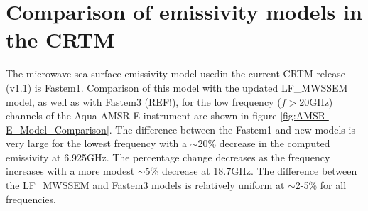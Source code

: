 \section{Comparison of emissivity models in the CRTM}

The microwave sea surface emissivity model usedin the current CRTM release (v1.1) is Fastem1\cite{Fastem1}. Comparison of this model with the updated LF\_MWSSEM model, as well as with Fastem3 (REF!), for the low frequency ($f\!>$20GHz) channels of the Aqua AMSR-E instrument are shown in figure \ref{fig:AMSR-E_Model_Comparison}. The difference between the Fastem1 and new models is very large for the lowest frequency with a $\sim$20\% decrease in the computed emissivity at 6.925GHz. The percentage change decreases as the frequency increases with a more modest $\sim$5\% decrease at 18.7GHz. The difference between the LF\_MWSSEM and Fastem3 models is relatively uniform at $\sim$2-5\% for all frequencies.

